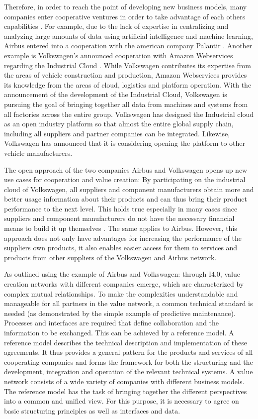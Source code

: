 Therefore, in order to reach the point of developing new business models, many companies  enter cooperative ventures in order to take advantage of each others capabilities \cite{Russo2018HowCompetition}. For example, due to the lack of expertise in centralizing and analyzing large amounts of data using artificial intelligence and machine learning, Airbus entered into a cooperation with the american company Palantir \cite{Hanke2019AirbusWerden}. Another example is Volkswagen's announced cooperation with Amazon Webservices regarding the Industrial Cloud \cite{VolkswagenAG2019WirLive}. While Volkswagen contributes its expertise from the areas of vehicle construction and production, Amazon Webservices provides its knowledge from the areas of cloud, logistics and platform operation. With the announcement of the development of the Industrial Cloud, Volkswagen is pursuing the goal of bringing together all data from machines and systems from all factories across the entire group. Volkswagen has designed the Industrial cloud as an open industry platform so that almost the entire global supply chain, including all suppliers and partner companies can be integrated. Likewise, Volkswagen has announced that it is considering opening the platform to other vehicle manufacturers.

The open approach of the two companies Airbus and Volkswagen opens up new use cases for cooperation and value creation: By participating on the industrial cloud of Volkswagen, all suppliers and component manufacturers obtain more and better usage information about their products and can thus bring their product performance to the next level. This holds true especially in many cases since suppliers and component manufacturers do not have the necessary financial means to build it up themselves \cite{Russo2018HowCompetition}. The same applies to Airbus. However, this approach does not only have advantages for increasing the performance of the suppliers own products, it also enables easier access for them to services and products from other suppliers of the Volkswagen and Airbus network. 

As outlined using the example of Airbus and Volkswagen: through \ac{I4.0}, value creation networks with different companies emerge, which are characterized by complex mutual relationships. To make the complexities understandable and manageable for all partners in the value network, a common technical standard is needed (as demonstrated by the simple example of predictive maintenance). Processes and interfaces are required that define collaboration and the information to be exchanged. This can be achieved by a reference model. A reference model describes the technical description and implementation of these agreements. It thus provides a general pattern for the products and services of all cooperating companies and forms the framework for both the structuring and the development, integration and operation of the relevant technical systems. A value network consists of a wide variety of companies with different business models. The reference model has the task of bringing together the different perspectives into a common and unified view. For this purpose, it is necessary to agree on basic structuring principles as well as interfaces and data.

